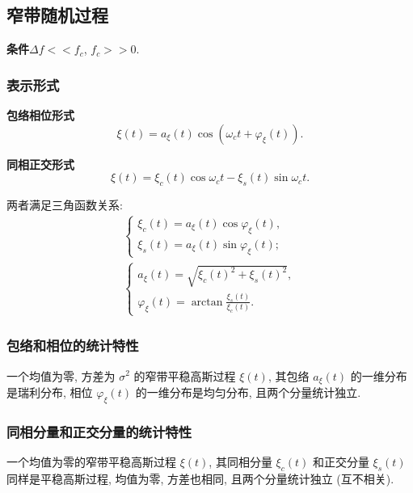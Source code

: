 \subsection{窄带随机过程} \label{3.5}
\textbf{条件}\quad $\Delta f<<f_c$, $f_c>>0$.

\subsubsection{表示形式}
\textbf{包络相位形式}
\begin{equation}
    \xi(t)=a_\xi(t)\cos(\omega_ct+\varphi_\xi(t)).
\end{equation}

\textbf{同相正交形式}
\begin{equation}
    \xi(t)=\xi_c(t)\cos\omega_ct-\xi_s(t)\sin\omega_ct.
\end{equation}

两者满足三角函数关系:
\begin{gather}
    \begin{cases}
        \xi_c(t)=a_\xi(t)\cos\varphi_\xi(t), \\
        \xi_s(t)=a_\xi(t)\sin\varphi_\xi(t);
    \end{cases} \\
    \begin{cases}
        a_\xi(t)=\sqrt{\xi_c(t)^2+\xi_s(t)^2}, \\
        \varphi_\xi(t)=\arctan\frac{\xi_s(t)}{\xi_c(t)}.
    \end{cases}
\end{gather}

\subsubsection{包络和相位的统计特性}
一个均值为零, 方差为 $\sigma^2$ 的窄带平稳高斯过程 $\xi(t)$, 其包络 $a_\xi(t)$ 的一维分布是瑞利分布, 相位 $\varphi_\xi(t)$ 的一维分布是均匀分布, 且两个分量统计独立.

\subsubsection{同相分量和正交分量的统计特性}
一个均值为零的窄带平稳高斯过程 $\xi(t)$, 其同相分量 $\xi_c(t)$ 和正交分量 $\xi_s(t)$ 同样是平稳高斯过程, 均值为零, 方差也相同, 且两个分量统计独立 (互不相关).
